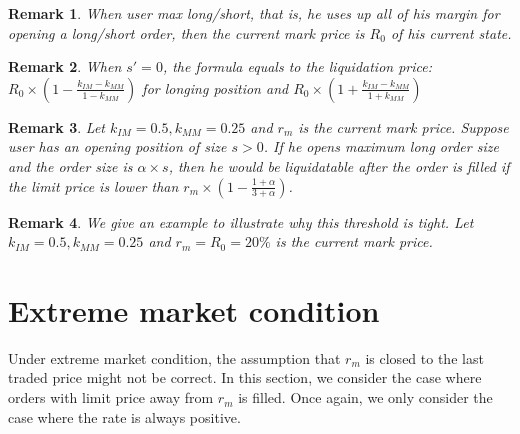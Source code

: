 \documentclass[notitlepage,reqno,11pt]{amsart}
\numberwithin{equation}{section}
\newtheorem{remark}{Remark}[section]
\newcommand{\af}{\alpha}
\begin{document}
\begin{remark}
    When user max long/short, that is, he uses up all of his margin for opening a long/short order, then the current mark price is $R_0$ of his current state.
\end{remark}

\begin{remark}
    When $s' = 0$, the formula equals to the liquidation price: $R_0\times(1-\frac{k_{IM}-k_{MM}}{1-k_{MM}})$ for longing position and $R_0\times(1+\frac{k_{IM}-k_{MM}}{1+k_{MM}})$
\end{remark}

\begin{remark}
    Let $k_{IM}=0.5,k_{MM}=0.25$ and $r_m$ is the current mark price. Suppose user has an opening position of size $s>0$. If he opens maximum long order size and the order size is $\af\times s$, then he would be liquidatable after the order is filled if the limit price is lower than $r_m\times(1- \frac{1+\af}{3+\af})$.
\end{remark}

\begin{remark}
    We give an example to illustrate why this threshold is tight. Let $k_{IM}=0.5,k_{MM}=0.25$ and $r_m=R_0 = 20\%$ is the current mark price. 
\end{remark}

\section{Extreme market condition}

Under extreme market condition, the assumption that $r_m$ is closed to the last traded price might not be correct. In this section, we consider the case where orders with limit price away from $r_m$ is filled. Once again, we only consider the case where the rate is always positive. 
\end{document}
